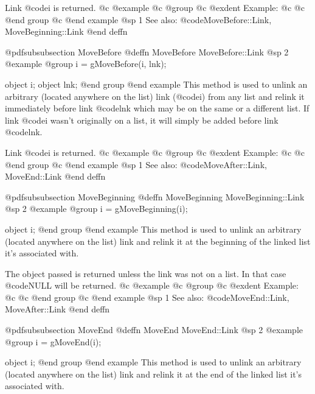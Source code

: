 Link @code{i} is returned.
@c @example
@c @group
@c @exdent Example:
@c 
@c @end group
@c @end example
@sp 1
See also:  @code{MoveBefore::Link, MoveBeginning::Link}
@end deffn







@pdfsubsubsection {MoveBefore}
@deffn {MoveBefore} MoveBefore::Link
@sp 2
@example
@group
i = gMoveBefore(i, lnk);

object  i;
object  lnk;
@end group
@end example
This method is used to unlink an arbitrary (located anywhere on the
list) link (@code{i}) from any list and relink it immediately before link
@code{lnk} which may be on the same or a different list.  If link
@code{i} wasn't originally on a list, it will simply be added before
link @code{lnk}.

Link @code{i} is returned.
@c @example
@c @group
@c @exdent Example:
@c 
@c @end group
@c @end example
@sp 1
See also:  @code{MoveAfter::Link, MoveEnd::Link}
@end deffn













@pdfsubsubsection {MoveBeginning}
@deffn {MoveBeginning} MoveBeginning::Link
@sp 2
@example
@group
i = gMoveBeginning(i);

object  i;
@end group
@end example
This method is used to unlink an arbitrary (located anywhere on the
list) link and relink it at the beginning of the linked list it's
associated with.  

The object passed is returned unless the link was not on a list.  In
that case @code{NULL} will be returned.
@c @example
@c @group
@c @exdent Example:
@c 
@c @end group
@c @end example
@sp 1
See also:  @code{MoveEnd::Link, MoveAfter::Link}
@end deffn












@pdfsubsubsection {MoveEnd}
@deffn {MoveEnd} MoveEnd::Link
@sp 2
@example
@group
i = gMoveEnd(i);

object  i;
@end group
@end example
This method is used to unlink an arbitrary (located anywhere on the
list) link and relink it at the end of the linked list it's
associated with.  

